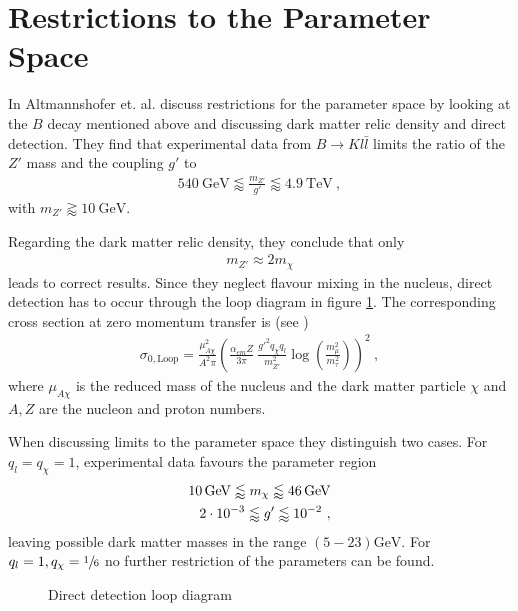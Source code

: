 \section{Restrictions to the Parameter Space}
In \cite{Z} Altmannshofer et. al. discuss restrictions for the parameter space by looking at the $B$ decay mentioned above and discussing dark matter relic density and direct detection. They find that experimental data from $B\rightarrow Kl\bar{l}$ limits the ratio of the $Z'$ mass and the coupling $g'$ to
\begin{align}\label{eq:BoundBS}
	\SI{540}{\giga\electronvolt}\lessapprox\frac{m_{Z'}}{g'}\lessapprox\SI{4.9}{\tera\electronvolt} \ ,
\end{align}
with $m_{Z'}\gtrapprox\SI{10}{\giga\electronvolt}$.


Regarding the dark matter relic density, they conclude that only
\begin{align}
	m_{Z'}\approx 2m_\chi
\end{align}
leads to correct results. Since they neglect flavour mixing in the nucleus, direct detection has to occur through the loop diagram in figure \ref{fig:Loop}. The corresponding cross section at zero momentum transfer is (see \cite{Z})
\begin{align}
	\sigma_{0,\text{Loop}} = \frac{\mu_{A\chi}^2}{A^2\pi}\left(\frac{\alpha_{em}Z}{3\pi}\ \frac{g'^2q_\chi q_l}{m_{Z'}^2}\log\left(\frac{m_\mu^2}{m_\tau^2}\right)\right)^2 \ ,
\end{align}
where $\mu_{A\chi}$ is the reduced mass of the nucleus and the dark matter particle $\chi$ and $A,Z$ are the nucleon and proton numbers.


When discussing limits to the parameter space they distinguish two cases. For $q_l=q_\chi=1$, experimental data favours the parameter region
\begin{align}
	\SI{10}{\giga\electronvolt}\lessapprox m_\chi\lessapprox\SI{46}{\giga\electronvolt}\notag \\
	\SI{2e-3}{}\lessapprox g'\lessapprox\SI{e-2}{} \ ,
\end{align}
leaving possible dark matter masses in the range $(5-23)\si{\giga\electronvolt}$. For $q_l=1,q_\chi=\sfrac{1}{6}$ no further restriction of the parameters can be found.
\begin{figure}
	\centering
	
	\caption{Direct detection loop diagram}
	\label{fig:Loop}
\end{figure}


